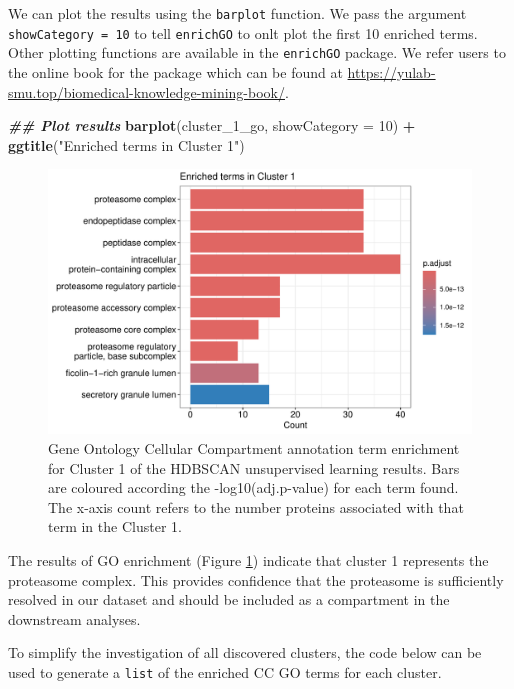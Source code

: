 \documentclass[9pt,a4paper,]{extarticle}
\newenvironment{Shaded}{\begin{snugshade}}{\end{snugshade}}
\newcommand{\AttributeTok}[1]{\textcolor[rgb]{0.13,0.29,0.53}{#1}}
\newcommand{\DecValTok}[1]{\textcolor[rgb]{0.00,0.00,0.81}{#1}}
\newcommand{\DocumentationTok}[1]{\textcolor[rgb]{0.56,0.35,0.01}{\textbf{\textit{#1}}}}
\newcommand{\FunctionTok}[1]{\textcolor[rgb]{0.13,0.29,0.53}{\textbf{#1}}}
\newcommand{\NormalTok}[1]{#1}
\newcommand{\SpecialCharTok}[1]{\textcolor[rgb]{0.81,0.36,0.00}{\textbf{#1}}}
\newcommand{\StringTok}[1]{\textcolor[rgb]{0.31,0.60,0.02}{#1}}
\begin{document}
We can plot the results using the \texttt{barplot} function. We pass the argument
\texttt{showCategory\ =\ 10} to tell \texttt{enrichGO} to onlt plot the first 10 enriched terms.
Other plotting functions are available in the \texttt{enrichGO} package. We refer
users to the online book for the package which can be found at
\url{https://yulab-smu.top/biomedical-knowledge-mining-book/}.

\begin{Shaded}
\begin{Highlighting}[]
\DocumentationTok{\#\# Plot results}
\FunctionTok{barplot}\NormalTok{(cluster\_1\_go, }\AttributeTok{showCategory =} \DecValTok{10}\NormalTok{) }\SpecialCharTok{+}
  \FunctionTok{ggtitle}\NormalTok{(}\StringTok{"Enriched terms in Cluster 1"}\NormalTok{)}
\end{Highlighting}
\end{Shaded}

\begin{figure}[H]

{\centering \includegraphics[width=0.8\linewidth,]{figs/go_barplot} 

}

\caption{Gene Ontology Cellular Compartment annotation term enrichment for Cluster 1 of the HDBSCAN unsupervised learning results. Bars are coloured according the -log10(adj.p-value) for each term found. The x-axis count refers to the number proteins associated with that term in the Cluster 1.}\label{fig:hdb-go-fig}
\end{figure}

The results of GO enrichment (Figure \ref{fig:hdb-go-fig}) indicate that
cluster 1 represents the proteasome complex. This provides confidence that the
proteasome is sufficiently resolved in our dataset and should be included as a
compartment in the downstream analyses.

To simplify the investigation of all discovered clusters, the code below can be
used to generate a \texttt{list} of the enriched CC GO terms for each cluster.
\end{document}
